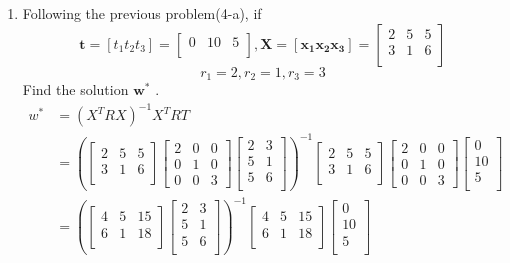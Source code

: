\documentclass[12pt, a4paper]{article}
\begin{document}
\begin{enumerate}
\begin{enumerate}
    \item Following the previous problem(4-a), if
$$\mathbf t = [t_1 t_2 t_3] = \begin{bmatrix}
       0  &10&5\\ 
     \end{bmatrix},
     \mathbf X=[\mathbf {x_1 x_2 x_3}] = \begin{bmatrix}
       2 & 5 &5          \\[0.3em]
       3 & 1 & 6         \\[0.3em]
     \end{bmatrix}$$
     $$r_1 = 2, r_2 = 1, r_3 = 3$$
    Find the solution $\mathbf w^{*}$ .\\
    \begin{align*}
        w^* &= (X^TRX)^{-1}X^TRT\\
        &= (\begin{bmatrix}2&5&5\\3&1&6\\\end{bmatrix}\begin{bmatrix}2&0&0\\0&1&0\\0&0&3\end{bmatrix}\begin{bmatrix}2&3\\5&1\\5&6\\\end{bmatrix})^{-1}\begin{bmatrix}2&5&5\\3&1&6\\\end{bmatrix}\begin{bmatrix}2&0&0\\0&1&0\\0&0&3\end{bmatrix}\begin{bmatrix}0\\10\\5\\\end{bmatrix}\\
        &= (\begin{bmatrix}4&5&15\\6&1&18\\\end{bmatrix}\begin{bmatrix}2&3\\5&1\\5&6\\\end{bmatrix})^{-1}\begin{bmatrix}4&5&15\\6&1&18\\\end{bmatrix}\begin{bmatrix}0\\10\\5\\\end{bmatrix}\\

\end{align*}
\end{enumerate}
\end{enumerate}
\end{document}
